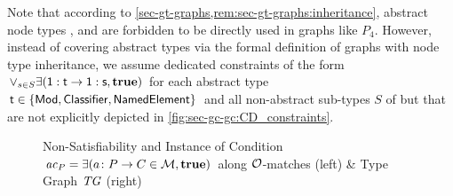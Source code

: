 \begin{example}
\begin{enumerate*}
\end{enumerate*}
Note that according to \cref{sec-gt-graphs,rem:sec-gt-graphs:inheritance}, abstract node types ,  and  are forbidden to be directly used in graphs like $P_4$.
However, instead of covering abstract types via the formal definition of graphs with node type inheritance, we assume dedicated constraints of the form $\vee_{s \in S}\exists(\mathsf{1:t} \to \mathsf{1:s},\textbf{true})$ for each abstract type $\mathsf{t} \in \{\mathsf{Mod},\mathsf{Classifier},\mathsf{NamedElement}\}$ and all non-abstract sub-types $S$ of  but that are not explicitly depicted in \cref{fig:sec-gc-gc:CD_constraints}.
\envEndMarker
\end{example}

\begin{figure}[!tb]
\begin{center}
\end{center}
\caption{Non-Satisfiability and Instance of Condition $\mathit{ac}_P=\exists(a\colon P \to C \in {\cal M},\textbf{true})$ along ${\cal O}$-matches (left) \& Type Graph $\mathit{TG}$ (right)}
\label{fig:sec-gc-gc:ac_schema}
\end{figure}

